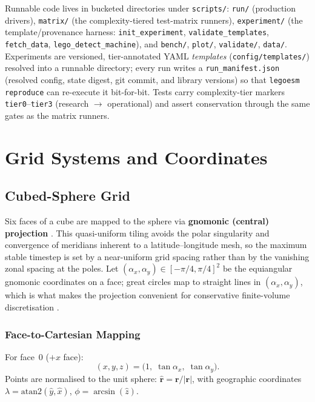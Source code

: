 \documentclass[11pt,twoside]{report}
\newcommand{\vect}[1]{\bm{#1}}
\begin{document}
Runnable code lives in bucketed directories under \texttt{scripts/}:
\texttt{run/} (production drivers), \texttt{matrix/} (the complexity-tiered
test-matrix runners), \texttt{experiment/} (the template/provenance harness:
\texttt{init\_experiment}, \texttt{validate\_templates}, \texttt{fetch\_data},
\texttt{lego\_detect\_machine}), and \texttt{bench/}, \texttt{plot/},
\texttt{validate/}, \texttt{data/}.  Experiments are versioned, tier-annotated
YAML \emph{templates} (\texttt{config/templates/}) resolved into a runnable
directory; every run writes a \texttt{run\_manifest.json} (resolved config,
state digest, git commit, and library versions) so that
\texttt{legoesm reproduce} can re-execute it bit-for-bit.  Tests carry
complexity-tier markers \texttt{tier0}--\texttt{tier3} (research $\to$
operational) and assert conservation through the same gates as the matrix
runners.


\chapter{Grid Systems and Coordinates}
\label{ch:grids}

\section{Cubed-Sphere Grid}
\label{sec:cubed-sphere}

Six faces of a cube are mapped to the sphere via \textbf{gnomonic (central)
projection} \citep{Ronchi1996,PutmanLin2007}.  This quasi-uniform tiling avoids
the polar singularity and convergence of meridians inherent to a latitude--longitude
mesh, so the maximum stable timestep is set by a near-uniform grid spacing rather
than by the vanishing zonal spacing at the poles.  Let
$(\alpha_x,\alpha_y)\in[-\pi/4,\pi/4]^2$ be the equiangular gnomonic
coordinates on a face; great circles map to straight lines in $(\alpha_x,\alpha_y)$,
which is what makes the projection convenient for conservative finite-volume
discretisation \citep{Sadourny1972}.

\subsection{Face-to-Cartesian Mapping}

For face~0 ($+x$ face):
\begin{equation}
  (x,y,z) = \bigl(1,\;\tan\alpha_x,\;\tan\alpha_y\bigr).
\end{equation}
Points are normalised to the unit sphere: $\hat{\vect{r}}=\vect{r}/|\vect{r}|$,
with geographic coordinates $\lambda=\mathrm{atan2}(\hat y,\hat x)$,
$\phi=\arcsin(\hat z)$.
\end{document}
